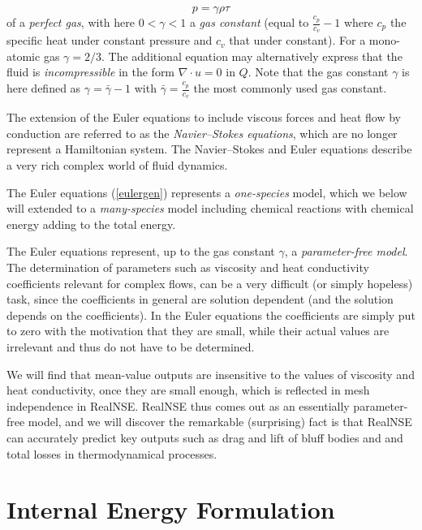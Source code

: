 \begin{equation}\label{stateeq}
p=\gamma\rho\tau
\end{equation}
of a \emph{perfect gas}, with here $0<\gamma <1$ a \emph{gas constant}
(equal to $\frac{c_p}{c_v}-1$ where $c_p$ the specific heat under 
constant pressure
and $c_v$ that under constant). For a mono-atomic
gas $\gamma =2/3$. The additional equation may alternatively
express that the fluid is \emph{incompressible} in the form $\nabla\cdot u=0$
in $Q$. Note that the gas constant $\gamma$ is here defined
as $\gamma = \bar\gamma -1$ with $\bar\gamma =\frac{c_p}{c_v}$
the most commonly used gas constant.  


The extension of the Euler equations to include viscous forces and heat 
flow by conduction are referred to as the \emph{Navier--Stokes equations},
which are no longer represent a Hamiltonian system.   
The Navier--Stokes and Euler equations describe a very rich complex 
world of fluid dynamics.

The Euler equations (\ref{eulergen}) represents a \emph{one-species}
model, which we below will extended to a \emph{many-species} model
including chemical reactions with chemical energy
adding to the total energy.

The Euler equations represent, up to the gas constant $\gamma$,
a \emph{parameter-free model}. The determination
of parameters such as viscosity and heat conductivity coefficients
relevant for complex flows, can be a very difficult (or simply hopeless)
task, since the coefficients in general are solution dependent (and the
solution depends on the coefficients). In the Euler equations
the coefficients are simply put to zero with the motivation that they
are small, while their actual values are irrelevant and thus
do not have to be determined.

 
We will find that mean-value outputs are insensitive to 
the values of viscosity and heat conductivity, once they are small
enough, which is reflected in mesh independence in RealNSE.
RealNSE thus comes out as an essentially parameter-free model,
and we will discover the remarkable (surprising) fact is that 
RealNSE can accurately predict key outputs such as drag and lift
of bluff bodies and and total losses in thermodynamical processes.

\section{Internal Energy Formulation}


